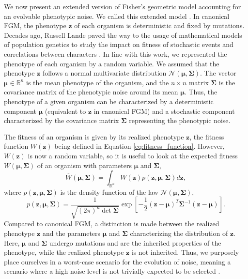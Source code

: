 
We now present an extended version of Fisher's geometric model accounting for an evolvable phenotypic noise. We called this extended model {\sigmaFGM}.
In canonical FGM, the phenotype $\boldsymbol{z}$ of each organism is deterministic and fixed by mutations.
Decades ago, Russell Lande paved the way to the usage of mathematical models of population genetics to study the impact on fitness of stochastic events  \citep{lande-1976} and correlations between characters \citep{lande-1983}. In line with this work, we represented the phenotype of each organism by a random variable. We assumed that the phenotype $\boldsymbol{z}$ follows a normal multivariate distribution $\mathcal{N}(\boldsymbol{\mu}, \boldsymbol{\Sigma})$.
The vector $\boldsymbol{\mu} \in \mathbb{R}^n$ is the mean phenotype of the organism, and the $n \times n$ matrix $\boldsymbol{\Sigma}$ is the covariance matrix of the phenotypic noise around its mean $\boldsymbol{\mu}$.
Thus, the phenotype of a given organism can be characterized by a deterministic component $\boldsymbol{\mu}$ (equivalent to $\boldsymbol{z}$ in canonical FGM) and a stochastic component characterized by the covariance matrix $\boldsymbol{\Sigma}$ representing the phenotypic noise.

The fitness of an organism is given by its realized phenotype $\boldsymbol{z}$,  the fitness function $W(\boldsymbol{z})$ being defined in Equation \ref{eq:fitness_function}. However, $W(\boldsymbol{z})$ is now a random variable, so it is useful to look at the expected fitness $\overline{W}(\boldsymbol{\mu},\boldsymbol{\Sigma})$ of an organism with parameters $\boldsymbol{\mu}$ and $\boldsymbol{\Sigma}$,
\begin{equation}
\overline{W}(\boldsymbol{\mu},\boldsymbol{\Sigma}) = \int_{\mathbb{R}^n} W(\boldsymbol{z}) p(\boldsymbol{z}, \boldsymbol{\mu},\boldsymbol{\Sigma}) d\boldsymbol{z},
\label{eq:integrative_fitness}
\end{equation}
where $p(\boldsymbol{z}, \boldsymbol{\mu},\boldsymbol{\Sigma})$ is the density function of the law $\mathcal{N}(\boldsymbol{\mu}, \boldsymbol{\Sigma})$,
\begin{equation}
p(\boldsymbol{z}, \boldsymbol{\mu},\boldsymbol{\Sigma}) = \dfrac{1}{\sqrt{(2\pi)^n \det \boldsymbol{\Sigma}}} \exp \left[ -\dfrac{1}{2} (\boldsymbol{z}-\boldsymbol{\mu})^T \boldsymbol{\Sigma}^{-1} (\boldsymbol{z}-\boldsymbol{\mu}) \right].
\label{eq:phenotypic_noise}
\end{equation}
Compared to canonical FGM, a distinction is made between the realized phenotype $\boldsymbol{z}$ and the parameters $\boldsymbol{\mu}$ and $\boldsymbol{\Sigma}$ characterizing the distribution of $\boldsymbol{z}$. Here, $\boldsymbol{\mu}$ and $\boldsymbol{\Sigma}$ undergo mutations and are the inherited properties of the phenotype, while the realized phenotype $\boldsymbol{z}$ is not inherited.
Thus, we purposely place ourselves in a worst-case scenario for the evolution of noise, meaning a scenario where a high noise level is not trivially expected to be selected \citep{charlebois-et-al-2011}.

